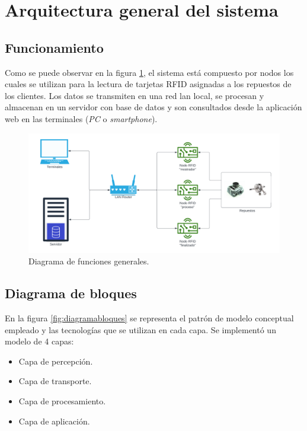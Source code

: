 \section{Arquitectura general del sistema}
\label{sec:arquitecturagral}

\subsection{Funcionamiento}
\label{subsec:funcionamiento}
Como se puede observar en la figura \ref{fig:diagramafunciones}, el sistema está compuesto por nodos los cuales se utilizan para la lectura de tarjetas RFID asignadas a los repuestos de los clientes. Los datos se transmiten en una red lan local, se procesan y almacenan en un servidor con base de datos y son consultados desde la aplicación web en las terminales (\textit{PC} o \textit{smartphone}).

\begin{figure}[H]
	\centering
	\includegraphics[scale=.50]{./Figures/diagramafunciones.png}
	\caption{Diagrama de funciones generales.}
	\label{fig:diagramafunciones}
\end{figure}

\subsection{Diagrama de bloques}
\label{subsec:diagramabloques}
En la figura \ref{fig:diagramabloques} se representa el patrón de modelo conceptual empleado y las tecnologías que se utilizan en cada capa. Se implementó un modelo de 4 capas: 

\begin{itemize}
\item Capa de percepción.
\item Capa de transporte.
\item Capa de procesamiento.
\item Capa de aplicación.
\end{itemize}


